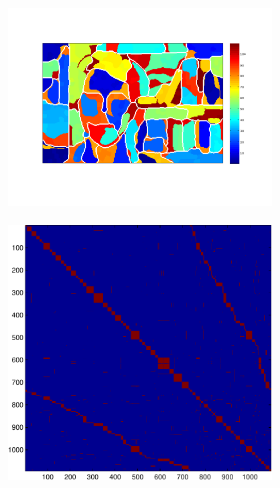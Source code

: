 \documentclass{article} %
\begin{document}
\begin{figure}
\begin{subfigure}[c]{\textwidth}
\begin{subfigure}[c]{0.195\textwidth}
			\label{fig:6_3_s_map}
		\end{subfigure}
		\begin{subfigure}[]{0.195\textwidth}
			\includegraphics[width = \textwidth]{./img/su6_3_s.pdf}
			\label{fig:6_3_s_su}
		\end{subfigure}
		\begin{subfigure}[c]{0.195\textwidth}
			\includegraphics[width = \textwidth]{./img/adj6_3_s.pdf}
			\label{fig6_3_s_adj}
		\end{subfigure}
	\end{subfigure}


\end{figure}
\end{document}
